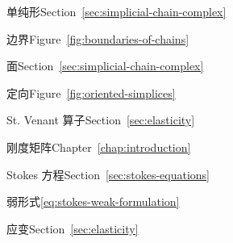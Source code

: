 \par\noindent\hspace*{0em}\label{index:simplex}{单纯形}\quad Section~\ref{sec:simplicial-chain-complex}

\par\noindent\hspace*{1em}\label{index:simplex-boundary-of}{边界}\quad Figure~\ref{fig:boundaries-of-chains}

\par\noindent\hspace*{1em}\label{index:simplex-face}{面}\quad Section~\ref{sec:simplicial-chain-complex}

\par\noindent\hspace*{1em}\label{index:simplex-orientation}{定向}\quad Figure~\ref{fig:oriented-simplices}

\par\noindent\hspace*{0em}\label{index:st-venant-operator}{St. Venant 算子}\quad Section~\ref{sec:elasticity}

\par\noindent\hspace*{0em}\label{index:stiffness-matrix}{刚度矩阵}\quad Chapter~\ref{chap:introduction}

\par\noindent\hspace*{0em}\label{index:stokes-equations}{Stokes 方程}\quad Section~\ref{sec:stokes-equations}

\par\noindent\hspace*{1em}\label{index:stokes-equations-weak-formulation}{弱形式}\quad \eqref{eq:stokes-weak-formulation}

\par\noindent\hspace*{0em}\label{index:strain}{应变}\quad Section~\ref{sec:elasticity}

